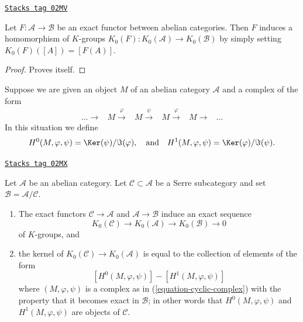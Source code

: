 \begin{lemma}
\label{homology-lemma-exact-functor-K-groups}
\href{https://stacks.math.columbia.edu/tag/02MV}{\texttt{Stacks tag 02MV}}

Let $F : \mathcal{A} \to \mathcal{B}$ be an exact functor between
abelian categories. Then $F$ induces a homomorphism of $K$-groups
$K_0(F) : K_0(\mathcal{A}) \to K_0(\mathcal{B})$ by simply setting
$K_0(F)([A]) = [F(A)]$.
\end{lemma}

\begin{proof}
Proves itself.
\end{proof}

Suppose we are given an object $M$ of an abelian category $\mathcal{A}$
and a complex of the form
\begin{equation}
\label{equation-cyclic-complex}
\begin{array}{cccccc}\ldots \longrightarrow & M \overset{\varphi}{\longrightarrow} & M \overset{\psi}{\longrightarrow} & M \overset{\varphi}{\longrightarrow} & M \longrightarrow & \ldots\end{array}
\end{equation}
In this situation we define
$$
H^0(M, \varphi, \psi) = \Ker(\psi)/\Im(\varphi)
, \quad\text{and}\quad
H^1(M, \varphi, \psi) = \Ker(\varphi)/\Im(\psi).
$$

\begin{lemma}
\label{homology-lemma-serre-subcategory-K-groups}
\href{https://stacks.math.columbia.edu/tag/02MX}{\texttt{Stacks tag 02MX}}

Let $\mathcal{A}$ be an abelian category.
Let $\mathcal{C} \subset \mathcal{A}$ be a Serre subcategory and
set $\mathcal{B} = \mathcal{A}/\mathcal{C}$.
\begin{enumerate}
\item The exact functors $\mathcal{C} \to \mathcal{A}$ and
$\mathcal{A} \to \mathcal{B}$ induce an exact sequence
$$
K_0(\mathcal{C}) \to
K_0(\mathcal{A}) \to
K_0(\mathcal{B}) \to
0
$$
of $K$-groups, and
\item the kernel of $K_0(\mathcal{C}) \to K_0(\mathcal{A})$ is equal
to the collection of elements of the form
$$
[H^0(M, \varphi, \psi)] - [H^1(M, \varphi, \psi)]
$$
where $(M, \varphi, \psi)$ is a complex as in (\ref{equation-cyclic-complex})
with the property that it becomes exact in $\mathcal{B}$; in other words
that $H^0(M, \varphi, \psi)$ and $H^1(M, \varphi, \psi)$ are
objects of $\mathcal{C}$.
\end{enumerate}
\end{lemma}

